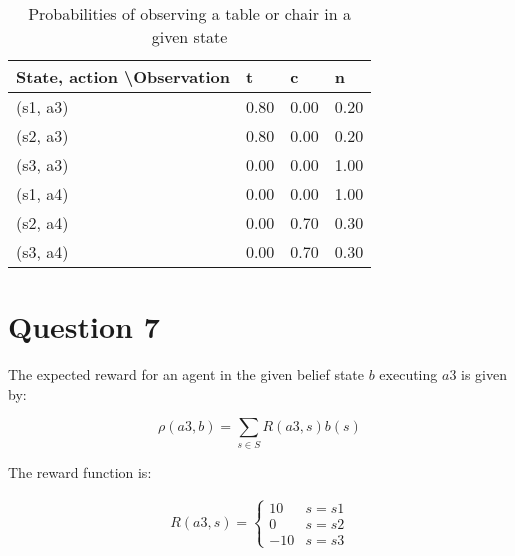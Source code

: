 \documentclass[12pt,notitlepage]{article}
\newcommand{\question}{\section*}
\begin{document}
\begin{table}[h]
\centering
\caption{Probabilities of observing a table or chair in a given state}
\label{my-label}
\begin{tabular}{|l|c|c|c|}
\hline
\textbf{State, action \textbackslash Observation} & \multicolumn{1}{l|}{\textbf{t}} & \multicolumn{1}{l|}{\textbf{c}} & \multicolumn{1}{l|}{\textbf{n}} \\ \hline
(s1, a3)                                          & 0.80                            & 0.00                            & 0.20                            \\ \hline
(s2, a3)                                          & 0.80                            & 0.00                            & 0.20                            \\ \hline
(s3, a3)                                          & 0.00                            & 0.00                            & 1.00                            \\ \hline
(s1, a4)                                          & 0.00                            & 0.00                            & 1.00                            \\ \hline
(s2, a4)                                          & \multicolumn{1}{l|}{0.00}       & \multicolumn{1}{l|}{0.70}       & \multicolumn{1}{l|}{0.30}       \\ \hline
(s3, a4)                                          & \multicolumn{1}{l|}{0.00}       & \multicolumn{1}{l|}{0.70}       & \multicolumn{1}{l|}{0.30}       \\ \hline
\end{tabular}
\end{table}

\pagebreak

\question{Question 7}

The expected reward for an agent in the given belief state $b$ executing $a3$ is
given by:

$$\rho(a3,b) = \sum_{s \in S} R(a3,s)b(s) $$

The reward function is:

\begin{align*}
R(a3,s) = \begin{cases}
                10 & s = s1 \\
                0 & s = s2 \\
                -10 & s = s3
                \end{cases} 
\end{align*}
\end{document}
